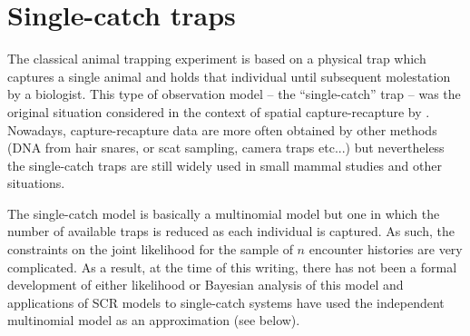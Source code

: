 \section{Single-catch traps}
\label{poisson-mn.sec.singlecatch}

The classical animal trapping experiment is based on a physical trap
which captures a single animal and holds that individual until
subsequent molestation by a biologist.
This type of observation model -- the ``single-catch'' trap --
was the original situation considered in the context of spatial
capture-recapture  by
\citet{efford:2004}. Nowadays, capture-recapture data are more often
obtained by other methods (DNA from hair snares, or scat sampling,
camera traps etc...) but nevertheless the single-catch traps are still
widely used in small mammal studies \citep{converse_etal:2006ea,
  converse_royle:2012} and other situations.

The single-catch model is basically a multinomial model but one in
which the number of available traps is reduced as each individual is
captured. As such, the constraints on the joint likelihood for the
sample of $n$ encounter histories are very complicated. 
 As a
result, at the time of this writing, there has not been a formal
development of either likelihood or Bayesian analysis of this model
and applications of SCR models to single-catch systems have used the
independent multinomial model as an approximation (see below).

